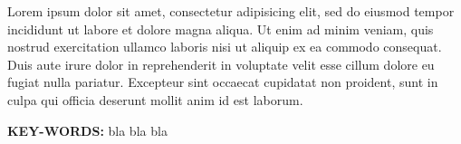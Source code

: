 Lorem ipsum dolor sit amet, consectetur adipisicing elit, sed do eiusmod
tempor incididunt ut labore et dolore magna aliqua. Ut enim ad minim veniam,
quis nostrud exercitation ullamco laboris nisi ut aliquip ex ea commodo
consequat. Duis aute irure dolor in reprehenderit in voluptate velit esse
cillum dolore eu fugiat nulla pariatur. Excepteur sint occaecat cupidatat non
proident, sunt in culpa qui officia deserunt mollit anim id est laborum.

\vspace{.6cm}
\textbf{KEY-WORDS: } bla bla bla

\restoregeometry
